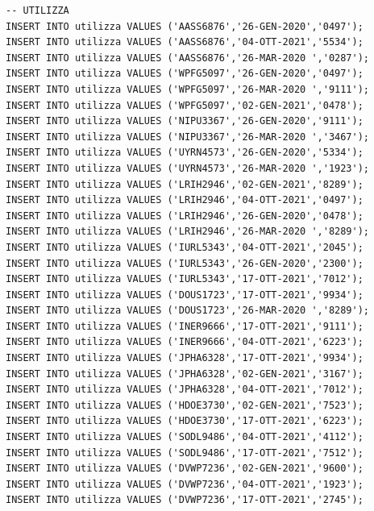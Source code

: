 \documentclass[12pt]{report}
\begin{document}
\begin{scriptsize}
\begin{verbatim}
-- UTILIZZA
INSERT INTO utilizza VALUES ('AASS6876','26-GEN-2020','0497');
INSERT INTO utilizza VALUES ('AASS6876','04-OTT-2021','5534');
INSERT INTO utilizza VALUES ('AASS6876','26-MAR-2020 ','0287');
INSERT INTO utilizza VALUES ('WPFG5097','26-GEN-2020','0497');
INSERT INTO utilizza VALUES ('WPFG5097','26-MAR-2020 ','9111');
INSERT INTO utilizza VALUES ('WPFG5097','02-GEN-2021','0478');
INSERT INTO utilizza VALUES ('NIPU3367','26-GEN-2020','9111');
INSERT INTO utilizza VALUES ('NIPU3367','26-MAR-2020 ','3467');
INSERT INTO utilizza VALUES ('UYRN4573','26-GEN-2020','5334');
INSERT INTO utilizza VALUES ('UYRN4573','26-MAR-2020 ','1923');
INSERT INTO utilizza VALUES ('LRIH2946','02-GEN-2021','8289');
INSERT INTO utilizza VALUES ('LRIH2946','04-OTT-2021','0497');
INSERT INTO utilizza VALUES ('LRIH2946','26-GEN-2020','0478');
INSERT INTO utilizza VALUES ('LRIH2946','26-MAR-2020 ','8289');
INSERT INTO utilizza VALUES ('IURL5343','04-OTT-2021','2045');
INSERT INTO utilizza VALUES ('IURL5343','26-GEN-2020','2300');
INSERT INTO utilizza VALUES ('IURL5343','17-OTT-2021','7012');
INSERT INTO utilizza VALUES ('DOUS1723','17-OTT-2021','9934');
INSERT INTO utilizza VALUES ('DOUS1723','26-MAR-2020 ','8289');
INSERT INTO utilizza VALUES ('INER9666','17-OTT-2021','9111');
INSERT INTO utilizza VALUES ('INER9666','04-OTT-2021','6223');
INSERT INTO utilizza VALUES ('JPHA6328','17-OTT-2021','9934');
INSERT INTO utilizza VALUES ('JPHA6328','02-GEN-2021','3167');
INSERT INTO utilizza VALUES ('JPHA6328','04-OTT-2021','7012');
INSERT INTO utilizza VALUES ('HDOE3730','02-GEN-2021','7523');
INSERT INTO utilizza VALUES ('HDOE3730','17-OTT-2021','6223');
INSERT INTO utilizza VALUES ('SODL9486','04-OTT-2021','4112');
INSERT INTO utilizza VALUES ('SODL9486','17-OTT-2021','7512');
INSERT INTO utilizza VALUES ('DVWP7236','02-GEN-2021','9600');
INSERT INTO utilizza VALUES ('DVWP7236','04-OTT-2021','1923');
INSERT INTO utilizza VALUES ('DVWP7236','17-OTT-2021','2745');


\end{verbatim}
\end{scriptsize}
\end{document}
